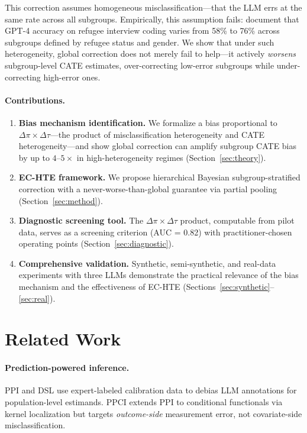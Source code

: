 \documentclass[11pt,a4paper]{article}
\begin{document}
This correction assumes homogeneous misclassification---that the LLM errs at the same rate across all subgroups.
Empirically, this assumption fails: \citet{ashwin2025using} document that GPT-4 accuracy on refugee interview coding varies from 58\% to 76\% across subgroups defined by refugee status and gender.
We show that under such heterogeneity, global correction does not merely fail to help---it actively \emph{worsens} subgroup-level CATE estimates, over-correcting low-error subgroups while under-correcting high-error ones.

\paragraph{Contributions.}
\begin{enumerate}
\item \textbf{Bias mechanism identification.} We formalize a bias proportional to $\Delta\pi \times \Delta\tau$---the product of misclassification heterogeneity and CATE heterogeneity---and show global correction can amplify subgroup CATE bias by up to $4\text{--}5\times$ in high-heterogeneity regimes (Section~\ref{sec:theory}).
\item \textbf{EC-HTE framework.} We propose hierarchical Bayesian subgroup-stratified correction with a never-worse-than-global guarantee via partial pooling (Section~\ref{sec:method}).
\item \textbf{Diagnostic screening tool.} The $\Delta\pi \times \Delta\tau$ product, computable from pilot data, serves as a screening criterion (AUC = 0.82) with practitioner-chosen operating points (Section~\ref{sec:diagnostic}).
\item \textbf{Comprehensive validation.} Synthetic, semi-synthetic, and real-data experiments with three LLMs demonstrate the practical relevance of the bias mechanism and the effectiveness of EC-HTE (Sections~\ref{sec:synthetic}--\ref{sec:real}).
\end{enumerate}

\section{Related Work}

\paragraph{Prediction-powered inference.}
PPI \citep{angelopoulos2023prediction} and DSL \citep{egami2024using} use expert-labeled calibration data to debias LLM annotations for population-level estimands.
PPCI \citep{sui2026prediction} extends PPI to conditional functionals via kernel localization but targets \emph{outcome-side} measurement error, not covariate-side misclassification.
\end{document}
